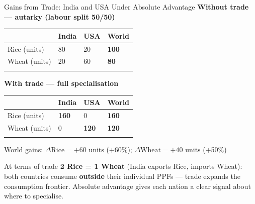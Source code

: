 \documentclass[
  ignorenonframetext,
  aspectratio=169,
]{beamer}
\makeatletter
\let\quarto@originallabel\label
\DeclareRobustCommand*{\label}[1]{\quarto@originallabel{#1}}
\makeatother
\begin{document}
\begin{frame}{Gains from Trade: India and USA Under Absolute Advantage}
\label{gains-from-trade-india-and-usa-under-absolute-advantage}
\textbf{Without trade --- autarky (labour split 50/50)}

\begin{longtable}[]{@{}llll@{}}
\toprule\noalign{}
& India & USA & World \\
\midrule\noalign{}
\endhead
Rice (units) & 80 & 20 & \textbf{100} \\
Wheat (units) & 20 & 60 & \textbf{80} \\
\bottomrule\noalign{}
\end{longtable}

\textbf{With trade --- full specialisation}

\begin{longtable}[]{@{}llll@{}}
\toprule\noalign{}
& India & USA & World \\
\midrule\noalign{}
\endhead
Rice (units) & \textbf{160} & 0 & \textbf{160} \\
Wheat (units) & 0 & \textbf{120} & \textbf{120} \\
\bottomrule\noalign{}
\end{longtable}

World gains: \(\Delta \text{Rice} = +60 \text{ units}\) (+60\%);
\(\Delta \text{Wheat} = +40 \text{ units}\) (+50\%)

At terms of trade \textbf{2 Rice = 1 Wheat} (India exports Rice, imports
Wheat): both countries consume \textbf{outside} their individual PPFs
--- trade expands the consumption frontier. Absolute advantage gives
each nation a clear signal about where to specialise.
\end{frame}
\end{document}
